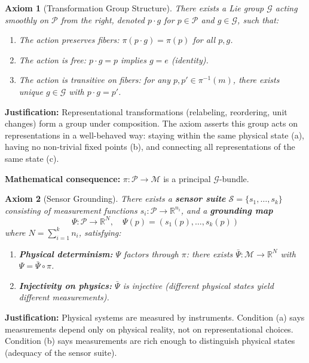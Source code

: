 \documentclass[11pt]{article}
\newtheorem{axiom}{Axiom}
\begin{document}
\begin{axiom}[Transformation Group Structure]
There exists a Lie group $\mathcal{G}$ acting smoothly on
$\mathcal{P}$ from the right, denoted $p \cdot g$ for $p \in \mathcal{P}$ and $g \in \mathcal{G}$, such that:
\begin{enumerate}
    \item[(a)] The action preserves fibers: $\pi(p \cdot g) = \pi(p)$ for all $p, g$.
    \item[(b)] The action is free: $p \cdot g = p$ implies $g = e$ (identity).
    \item[(c)] The action is transitive on fibers: for any $p, p' \in \pi^{-1}(m)$, there exists unique $g \in \mathcal{G}$ with $p \cdot g = p'$.
\end{enumerate}
\end{axiom}

\textbf{Justification:} Representational transformations (relabeling, reordering, unit changes) form
a group under composition. The axiom asserts this group acts on representations in a well-behaved way: staying within the same physical state (a), having no non-trivial fixed points (b),
and connecting all representations of the same state (c).

\textbf{Mathematical consequence:} $\pi : \mathcal{P} \to \mathcal{M}$ is a principal $\mathcal{G}$-bundle.

\begin{axiom}[Sensor Grounding]
There exists a \textbf{sensor suite} $\mathcal{S} = \{s_1, \ldots, s_k\}$ consisting of
measurement functions $s_i : \mathcal{P} \to \mathbb{R}^{n_i}$, and a \textbf{grounding map}
\[
\Psi : \mathcal{P} \to \mathbb{R}^N, \quad \Psi(p) = (s_1(p), \ldots, s_k(p))
\]
where $N = \sum_{i=1}^{k} n_i$, satisfying:
\begin{enumerate}
    \item[(a)] \textbf{Physical determinism:} $\Psi$ factors through $\pi$: there exists $\bar{\Psi} : \mathcal{M} \to \mathbb{R}^N$ with $\Psi = \bar{\Psi} \circ \pi$.
    \item[(b)] \textbf{Injectivity on physics:} $\bar{\Psi}$ is injective (different physical states yield different measurements).
\end{enumerate}
\end{axiom}

\textbf{Justification:} Physical systems are measured by instruments. Condition (a) says measurements depend only on physical reality, not on representational choices. Condition (b) says
measurements are rich enough to distinguish physical states (adequacy of the sensor suite).
\end{document}
